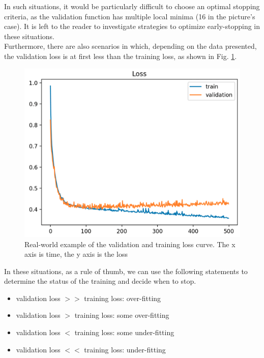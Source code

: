 In such situations, it would be particularly difficult to choose an optimal stopping criteria, as the validation function has multiple local minima (16 in the picture's case). It is left to the reader to investigate strategies to optimize early-stopping in these situations. \\
Furthermore, there are also scenarios in which, depending on the data presented, the validation loss is at first less than the training loss, as shown in Fig. \ref{fig:over_fitting_curve_2}. 
\begin{figure}[htb]
    \centering
    \includegraphics[scale = 0.4]{img/over_fitting_2.png}
    \caption[Real-world example of the validation and training loss curve]{Real-world example of the validation and training loss curve. The x axis is time, the y axis is the loss}
    \label{fig:over_fitting_curve_2}
\end{figure}

In these situations, as a rule of thumb, we can use the following statements to determine the status of the training and decide when to stop. 
\begin{itemize}
\item validation loss $>>$ training loss: over-fitting
\item validation loss $>$ training loss: some over-fitting
\item validation loss $<$ training loss: some under-fitting
\item validation loss $<<$ training loss: under-fitting

\end{itemize}


